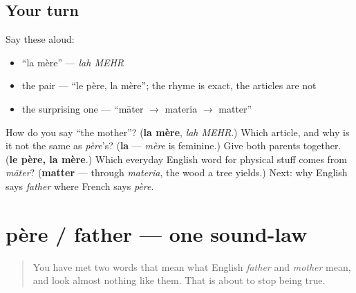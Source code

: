 \subsection*{Your turn}
Say these aloud:

\begin{itemize}
\raggedright
  \item \textquotedblleft{}la mère\textquotedblright{} — \emph{lah MEHR}
  \item the pair — \textquotedblleft{}le père, la mère\textquotedblright{}; the rhyme is exact, the articles are not
  \item the surprising one — \textquotedblleft{}māter $\to$ materia $\to$ matter\textquotedblright{}
\end{itemize}

\begin{tcolorbox}[breakable,colback=teal!4,colframe=teal!35!black,title={Before you move on}]
How do you say \textquotedblleft{}the mother\textquotedblright{}? (\textbf{la mère}, \emph{lah MEHR}.) Which article, and why is it not the same as \emph{père}'s? (\textbf{la} — \emph{mère} is feminine.) Give both parents together. (\textbf{le père, la mère}.) Which everyday English word for physical stuff comes from \emph{māter}? (\textbf{matter} — through \emph{materia}, the wood a tree yields.) Next: why English says \emph{father} where French says \emph{père}.
\end{tcolorbox}
\section[père / father]{père / father — one sound-law}

\label{lesson:FR-C10-grimm}



\begin{quote}
You have met two words that mean what English \emph{father} and \emph{mother} mean, and look almost nothing like them. That is about to stop being true.
\end{quote}

